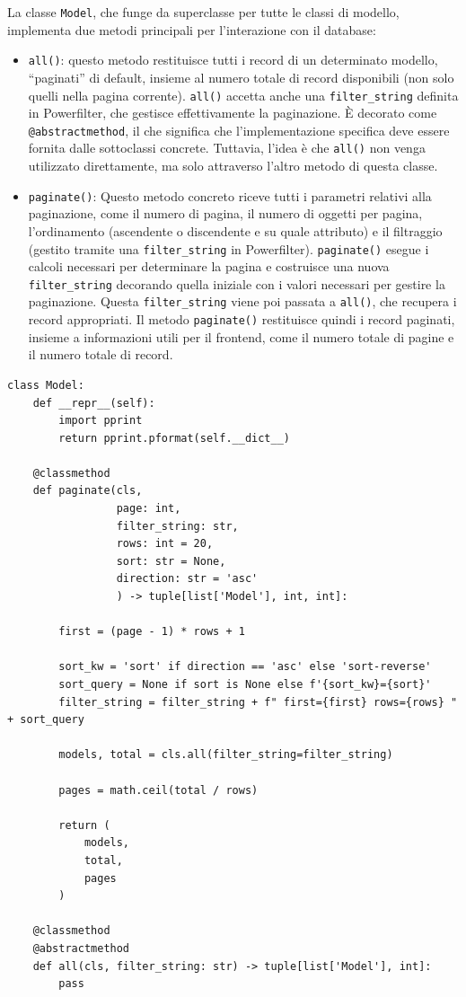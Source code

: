 La classe \texttt{Model}, che funge da superclasse per tutte le classi di modello, implementa due metodi principali per l'interazione con il database:
\begin{itemize}
    \item \texttt{all()}: questo metodo restituisce tutti i record di un determinato modello, ``paginati'' di default, insieme al numero totale di record disponibili (non solo quelli nella pagina corrente). \texttt{all()} accetta anche una \texttt{filter\_string} definita in Powerfilter, che gestisce effettivamente la paginazione. È decorato come \texttt{@abstractmethod}, il che significa che l'implementazione specifica deve essere fornita dalle sottoclassi concrete. Tuttavia, l'idea è che \texttt{all()} non venga utilizzato direttamente, ma solo attraverso l'altro metodo di questa classe.
    \item \texttt{paginate()}: Questo metodo concreto riceve tutti i parametri relativi alla paginazione, come il numero di pagina, il numero di oggetti per pagina, l'ordinamento (ascendente o discendente e su quale attributo) e il filtraggio (gestito tramite una \texttt{filter\_string} in Powerfilter). \texttt{paginate()} esegue i calcoli necessari per determinare la pagina e costruisce una nuova \texttt{filter\_string} decorando quella iniziale con i valori necessari per gestire la paginazione. Questa \texttt{filter\_string} viene poi passata a \texttt{all()}, che recupera i record appropriati. Il metodo \texttt{paginate()} restituisce quindi i record paginati, insieme a informazioni utili per il frontend, come il numero totale di pagine e il numero totale di record.
\end{itemize}

\begin{verbatim}
class Model:
    def __repr__(self):
        import pprint
        return pprint.pformat(self.__dict__)

    @classmethod
    def paginate(cls,
                 page: int,
                 filter_string: str,
                 rows: int = 20,
                 sort: str = None,
                 direction: str = 'asc'
                 ) -> tuple[list['Model'], int, int]:

        first = (page - 1) * rows + 1

        sort_kw = 'sort' if direction == 'asc' else 'sort-reverse'
        sort_query = None if sort is None else f'{sort_kw}={sort}'
        filter_string = filter_string + f" first={first} rows={rows} " + sort_query

        models, total = cls.all(filter_string=filter_string)

        pages = math.ceil(total / rows)

        return (
            models,
            total,
            pages
        )

    @classmethod
    @abstractmethod
    def all(cls, filter_string: str) -> tuple[list['Model'], int]:
        pass
\end{verbatim}

